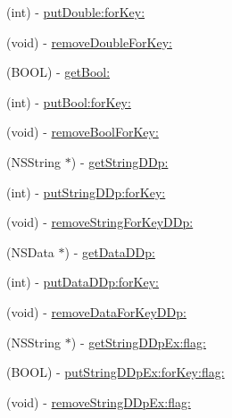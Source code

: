 \begin{DoxyCompactItemize}
\item 
(int) -\/ \mbox{\hyperlink{protocol_i_open_dynamic_data_store_component_01-p_ad7745ae9edc35a26280ff479268727c0}{put\+Double\+:for\+Key\+:}}
\item 
(void) -\/ \mbox{\hyperlink{protocol_i_open_dynamic_data_store_component_01-p_a43dc4d0603dd5b112dcd475e0d5a4cc5}{remove\+Double\+For\+Key\+:}}
\item 
(B\+O\+OL) -\/ \mbox{\hyperlink{protocol_i_open_dynamic_data_store_component_01-p_aff1d18488599766e184833634b8a7efc}{get\+Bool\+:}}
\item 
(int) -\/ \mbox{\hyperlink{protocol_i_open_dynamic_data_store_component_01-p_a8f8c0b3caa7a41e3ae888489c085eaa6}{put\+Bool\+:for\+Key\+:}}
\item 
(void) -\/ \mbox{\hyperlink{protocol_i_open_dynamic_data_store_component_01-p_ad933f9d2e0dd2f26ece3a6e89b2ec88f}{remove\+Bool\+For\+Key\+:}}
\item 
(N\+S\+String $\ast$) -\/ \mbox{\hyperlink{protocol_i_open_dynamic_data_store_component_01-p_ae0985c7cbf2a962ebe070c647f328349}{get\+String\+D\+Dp\+:}}
\item 
(int) -\/ \mbox{\hyperlink{protocol_i_open_dynamic_data_store_component_01-p_a42c1e60da9bac2584f7f0f7d1536f260}{put\+String\+D\+Dp\+:for\+Key\+:}}
\item 
(void) -\/ \mbox{\hyperlink{protocol_i_open_dynamic_data_store_component_01-p_a8c96eff4752365d0516bdb401c647511}{remove\+String\+For\+Key\+D\+Dp\+:}}
\item 
(N\+S\+Data $\ast$) -\/ \mbox{\hyperlink{protocol_i_open_dynamic_data_store_component_01-p_a8a4eacea2b085ad149596188cf81a9f7}{get\+Data\+D\+Dp\+:}}
\item 
(int) -\/ \mbox{\hyperlink{protocol_i_open_dynamic_data_store_component_01-p_aaf0245f9535bcb3f109afc17c661ccc0}{put\+Data\+D\+Dp\+:for\+Key\+:}}
\item 
(void) -\/ \mbox{\hyperlink{protocol_i_open_dynamic_data_store_component_01-p_a482b9decfa2560731942342a11bc52a2}{remove\+Data\+For\+Key\+D\+Dp\+:}}
\item 
(N\+S\+String $\ast$) -\/ \mbox{\hyperlink{protocol_i_open_dynamic_data_store_component_01-p_a2764a8c0ba6204774d7f2fb697d49546}{get\+String\+D\+Dp\+Ex\+:flag\+:}}
\item 
(B\+O\+OL) -\/ \mbox{\hyperlink{protocol_i_open_dynamic_data_store_component_01-p_a0e682949cf7038d18a8ebc38f86fff06}{put\+String\+D\+Dp\+Ex\+:for\+Key\+:flag\+:}}
\item 
(void) -\/ \mbox{\hyperlink{protocol_i_open_dynamic_data_store_component_01-p_a66f7cb4e5634d5bc6e823e93a86b25ce}{remove\+String\+D\+Dp\+Ex\+:flag\+:}}

\end{DoxyCompactItemize}
